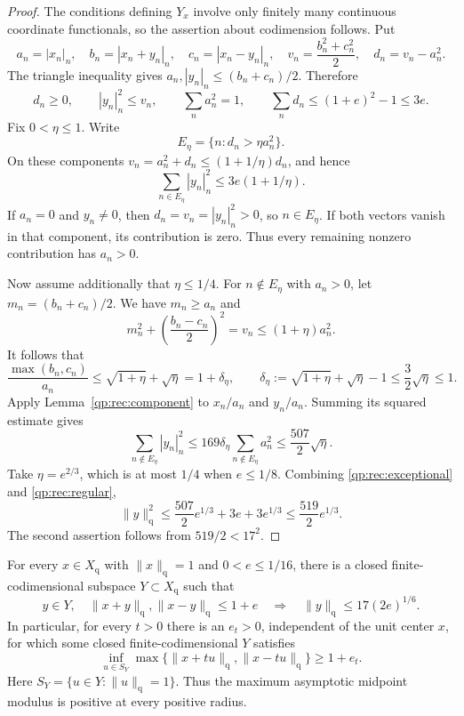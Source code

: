 \begin{proof}
The conditions defining \(Y_x\) involve only finitely many continuous
coordinate functionals, so the assertion about codimension follows.
Put
\[
 a_n=|x_n|_n,\quad b_n=|x_n+y_n|_n,\quad c_n=|x_n-y_n|_n,
 \quad v_n=\frac{b_n^2+c_n^2}{2},\quad d_n=v_n-a_n^2.
\]
The triangle inequality gives
\(a_n,|y_n|_n\le(b_n+c_n)/2\).  Therefore
\begin{equation}\label{qp:rec:outer-energy}
 d_n\ge0,\qquad |y_n|_n^2\le v_n,
 \qquad \sum_na_n^2=1,
 \qquad \sum_nd_n\le(1+e)^2-1\le3e.
\end{equation}
Fix \(0<\eta\le1\).  Write
\[
 E_\eta=\{n:d_n>\eta a_n^2\}.
\]
On these components \(v_n=a_n^2+d_n\le(1+1/\eta)d_n\), and hence
\begin{equation}\label{qp:rec:exceptional}
 \sum_{n\in E_\eta}|y_n|_n^2
 \le3e(1+1/\eta).
\end{equation}
If \(a_n=0\) and \(y_n\ne0\), then
\(d_n=v_n=|y_n|_n^2>0\), so \(n\in E_\eta\).
If both vectors vanish in that component, its contribution is zero.
Thus every remaining nonzero contribution has \(a_n>0\).

Now assume additionally that \(\eta\le1/4\).  For
\(n\notin E_\eta\) with \(a_n>0\), let
\(m_n=(b_n+c_n)/2\).  We have \(m_n\ge a_n\) and
\[
 m_n^2+\left(\frac{b_n-c_n}{2}\right)^2=v_n
                                             \le(1+\eta)a_n^2.
\]
It follows that
\[
 \frac{\max(b_n,c_n)}{a_n}
 \le\sqrt{1+\eta}+\sqrt\eta=1+\delta_\eta,
 \qquad
 \delta_\eta:=\sqrt{1+\eta}+\sqrt\eta-1
                  \le\frac32\sqrt\eta\le1.
\]
Apply Lemma~\ref{qp:rec:component} to
\(x_n/a_n\) and \(y_n/a_n\).  Summing its squared estimate gives
\begin{equation}\label{qp:rec:regular}
 \sum_{n\notin E_\eta}|y_n|_n^2
 \le169\delta_\eta\sum_{n\notin E_\eta}a_n^2
 \le\frac{507}{2}\sqrt\eta.
\end{equation}
Take \(\eta=e^{2/3}\), which is at most \(1/4\) when \(e\le1/8\).
Combining \eqref{qp:rec:exceptional} and \eqref{qp:rec:regular},
\[
 \|y\|_{\mathrm q}^2
 \le\frac{507}{2}e^{1/3}+3e+3e^{1/3}
 \le\frac{519}{2}e^{1/3}.
\]
The second assertion follows from \(519/2<17^2\).
\end{proof}

\begin{corollary}\label{qp:rec:all-centers}
For every \(x\in X_{\mathrm q}\) with \(\|x\|_{\mathrm q}=1\) and
\(0<e\le1/16\), there is a closed finite-codimensional subspace
\(Y\subset X_{\mathrm q}\) such that
\begin{equation}\label{qp:rec:complete-bound}
 y\in Y,\quad
 \|x+y\|_{\mathrm q},\|x-y\|_{\mathrm q}\le1+e
 \quad\Longrightarrow\quad
 \|y\|_{\mathrm q}\le17(2e)^{1/6}.
\end{equation}
In particular, for every \(t>0\) there is an \(e_t>0\), independent
of the unit center \(x\), for which some closed finite-codimensional
\(Y\) satisfies
\[
 \inf_{u\in S_Y}
 \max\{\|x+tu\|_{\mathrm q},\|x-tu\|_{\mathrm q}\}\ge1+e_t.
\]
Here \(S_Y=\{u\in Y:\|u\|_{\mathrm q}=1\}\).  Thus the maximum
asymptotic midpoint modulus is positive at every positive radius.
\end{corollary}

